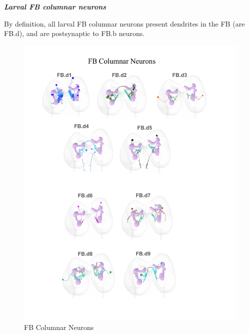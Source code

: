      

    \textbf{\textit{Larval FB columnar neurons}}



    By definition, all larval FB columnar neurons present dendrites in the FB (are FB.d), and are postsynaptic to FB.b neurons.

    \begin{figure}
        \centering
        \includegraphics[width=15cm]{Figs/CX/FBColumnar.pdf}
        \caption[FB Columnar Neurons]{FB Columnar Neurons}
        \label{FBColumnar}
    \end{figure}



